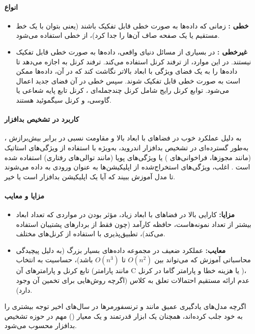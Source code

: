 \paragraph{انواع }
\begin{itemize}
    \renewcommand{\labelitemi}{\lr{$\bullet$}}
    \item \textbf{ خطی :} زمانی که داده‌ها به صورت خطی قابل تفکیک باشند (یعنی بتوان با یک خط مستقیم یا یک صفحه صاف آن‌ها را جدا کرد)، از  خطی استفاده می‌شود.
    \item \textbf{ غیرخطی :} در بسیاری از مسائل دنیای واقعی، داده‌ها به صورت خطی قابل تفکیک نیستند. در این موارد،  از ترفند کرنل  استفاده می‌کند. ترفند کرنل به  اجازه می‌دهد تا داده‌ها را به یک فضای ویژگی با ابعاد بالاتر نگاشت کند که در آن، داده‌ها ممکن است به صورت خطی قابل تفکیک شوند. سپس  خطی در آن فضای جدید اعمال می‌شود. توابع کرنل رایج شامل کرنل چندجمله‌ای ، کرنل تابع پایه شعاعی  یا گاوسی، و کرنل سیگموئید  هستند.
\end{itemize}

\paragraph{کاربرد در تشخیص بدافزار}
 به دلیل عملکرد خوب در فضاهای با ابعاد بالا و مقاومت نسبی در برابر بیش‌برازش ، به‌طور گسترده‌ای در تشخیص بدافزار اندروید، به‌ویژه با استفاده از ویژگی‌های استاتیک (مانند مجوزها، فراخوانی‌های ) یا ویژگی‌های پویا (مانند توالی‌های رفتاری) استفاده شده است \cite{AndroidMalwareSurvey, Demontis2017}. اغلب، ویژگی‌های استخراج‌شده از اپلیکیشن‌ها به عنوان ورودی به  داده می‌شوند تا مدل آموزش ببیند که آیا یک اپلیکیشن بدافزار است یا خیر.

\paragraph{مزایا و معایب}
\begin{itemize}
    \renewcommand{\labelitemi}{\lr{$\bullet$}}
    \item \textbf{مزایا:} کارایی بالا در فضاهای با ابعاد زیاد، مؤثر بودن در مواردی که تعداد ابعاد بیشتر از تعداد نمونه‌هاست، حافظه کارآمد (چون فقط از بردارهای پشتیبان استفاده می‌کند)، تطبیق‌پذیری با استفاده از کرنل‌های مختلف.
    \item \textbf{معایب:} عملکرد ضعیف در مجموعه داده‌های بسیار بزرگ (به دلیل پیچیدگی محاسباتی آموزش که می‌تواند بین \(O(n^2)\) تا \(O(n^3)\) باشد)، حساسیت به انتخاب تابع کرنل و پارامترهای آن (مانند پارامتر C یا هزینه خطا و پارامتر گاما در کرنل )، عدم ارائه مستقیم احتمالات تعلق به کلاس (اگرچه روش‌هایی برای تخمین آن وجود دارد).
\end{itemize}
اگرچه مدل‌های یادگیری عمیق مانند  و ترنسفورمرها در سال‌های اخیر توجه بیشتری را به خود جلب کرده‌اند،  همچنان یک ابزار قدرتمند و یک معیار () مهم در حوزه تشخیص بدافزار محسوب می‌شود.

